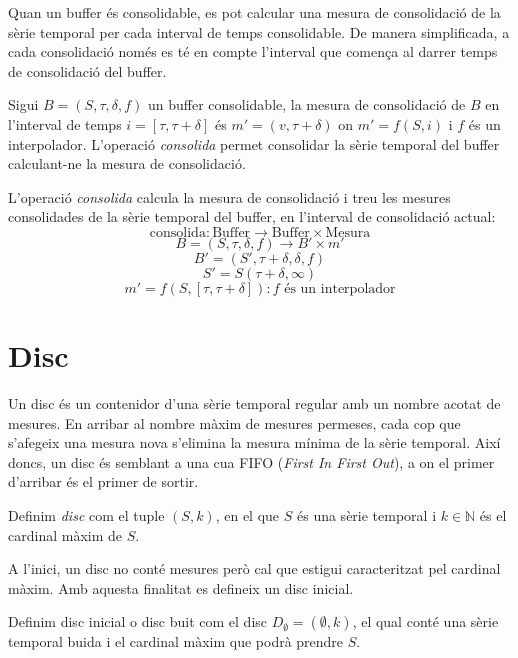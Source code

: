 Quan un buffer és consolidable, es pot calcular una mesura de consolidació de la sèrie temporal per cada interval de temps consolidable. De manera simplificada, a cada consolidació només es té en compte l'interval que comença al darrer temps de consolidació del buffer. 

Sigui $B=(S,\tau,\delta,f)$ un buffer consolidable, la mesura de consolidació de $B$ en l'interval de temps $i=[\tau,\tau+\delta]$ és $m'=(v,\tau+\delta)$ on $m'=f(S,i)$ i $f$ és un interpolador. L'operació \emph{consolida} permet consolidar la sèrie temporal del buffer calculant-ne la mesura de consolidació.

\begin{definition}
  L'operació \emph{consolida} calcula la mesura de consolidació i treu
  les mesures consolidades de la sèrie temporal del buffer, en
  l'interval de consolidació actual:
  \[
  \text{consolida}: \text{Buffer} \longrightarrow \text{Buffer} \times \text{Mesura}
  \]
  \[
  B=(S,\tau,\delta,f) \longrightarrow B' \times m'
  \]
  \[
  B'= (S',\tau+\delta,\delta,f)
  \]
  \[
  S' = S(\tau+\delta,\infty)
  \]
  \[
  m' = f(S,[\tau,\tau+\delta]): f \text{ és un interpolador}
  \]
\end{definition}



\section{Disc}\label{sec:model:disc}

Un disc és un contenidor d'una sèrie temporal regular amb un nombre acotat de mesures. En arribar al nombre màxim de mesures permeses, cada cop que s'afegeix una mesura nova s'elimina la mesura mínima de la sèrie temporal.
Així doncs, un disc és semblant a una cua FIFO (\emph{First In First Out}), a on el primer d'arribar és el primer de sortir.  

\begin{definition}[Disc]
  Definim \emph{disc} com el tuple $(S,k)$, en el que $S$
  és una sèrie temporal i $k\in\mathbb{N}$ és el cardinal màxim de $S$.
\end{definition}

A l'inici, un disc no conté mesures però cal que estigui caracteritzat pel cardinal màxim. Amb aquesta finalitat es defineix un disc inicial.

\begin{definition}\label{def:disc_buit}
  Definim disc inicial o disc buit com el disc $D_{\emptyset} =
  (\emptyset,k)$, el qual conté una sèrie temporal buida i el cardinal
  màxim que podrà prendre $S$.
\end{definition}

